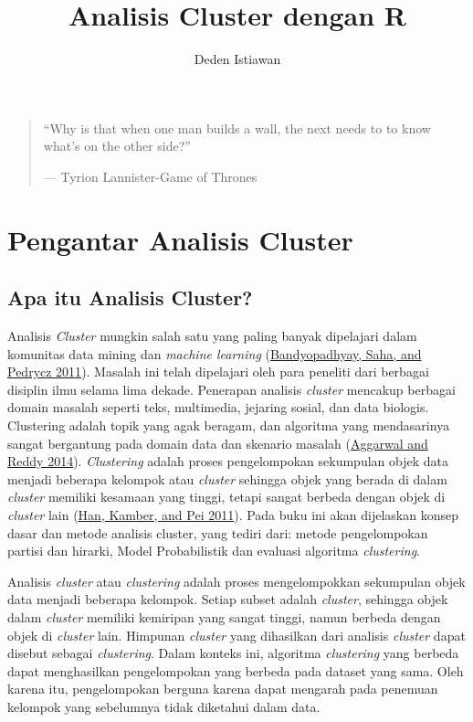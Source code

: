 \documentclass[
]{elegantbook}
\title{Analisis Cluster dengan R}
\author{Deden Istiawan}
\date{}
\begin{document}
\maketitle

{
\hypersetup{linkcolor=}
\setcounter{tocdepth}{1}
\tableofcontents
}
\mainmatter

\begin{quote}
``Why is that when one man builds a wall, the next needs to to know what's on the other side?''

\hspace*{\fill} --- Tyrion Lannister-Game of Thrones
\end{quote}

\hypertarget{pengantar-analisis-cluster}{%
\chapter{Pengantar Analisis Cluster}\label{pengantar-analisis-cluster}}

\hypertarget{apa-itu-analisis-cluster}{%
\section{Apa itu Analisis Cluster?}\label{apa-itu-analisis-cluster}}

Analisis \emph{Cluster} mungkin salah satu yang paling banyak dipelajari dalam komunitas data mining dan \emph{machine learning} (\protect\hyperlink{ref-bandyopadhyay2011}{Bandyopadhyay, Saha, and Pedrycz 2011}). Masalah ini telah dipelajari oleh para peneliti dari berbagai disiplin ilmu selama lima dekade. Penerapan analisis \emph{cluster} mencakup berbagai domain masalah seperti teks, multimedia, jejaring sosial, dan data biologis. Clustering adalah topik yang agak beragam, dan algoritma yang mendasarinya sangat bergantung pada domain data dan skenario masalah (\protect\hyperlink{ref-2014clustering}{Aggarwal and Reddy 2014}). \emph{Clustering} adalah proses pengelompokan sekumpulan objek data menjadi beberapa kelompok atau \emph{cluster} sehingga objek yang berada di dalam \emph{cluster} memiliki kesamaan yang tinggi, tetapi sangat berbeda dengan objek di \emph{cluster} lain (\protect\hyperlink{ref-HanEtAl11}{Han, Kamber, and Pei 2011}). Pada buku ini akan dijelaskan konsep dasar dan metode analisis cluster, yang tediri dari: metode pengelompokan partisi dan hirarki, Model Probabilistik dan evaluasi algoritma \emph{clustering}.

Analisis \emph{cluster} atau \emph{clustering} adalah proses mengelompokkan sekumpulan objek data menjadi beberapa kelompok. Setiap subset adalah \emph{cluster}, sehingga objek dalam \emph{cluster} memiliki kemiripan yang sangat tinggi, namun berbeda dengan objek di \emph{cluster} lain. Himpunan \emph{cluster} yang dihasilkan dari analisis \emph{cluster} dapat disebut sebagai \emph{clustering}. Dalam konteks ini, algoritma \emph{clustering} yang berbeda dapat menghasilkan pengelompokan yang berbeda pada dataset yang sama. Oleh karena itu, pengelompokan berguna karena dapat mengarah pada penemuan kelompok yang sebelumnya tidak diketahui dalam data.
\end{document}
